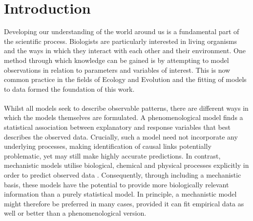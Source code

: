 \documentclass[11pt]{article}
\begin{document}

  

\doublespacing
\linenumbers 
\section{Introduction}
Developing our understanding of the world around us is a fundamental part of the scientific process. Biologists are particularly interested in living organisms and the ways in which they interact with each other and their environment. One method through which knowledge can be gained is by attempting to model observations in relation to parameters and variables of interest. This is now common practice in the fields of Ecology and Evolution and the fitting of models to data formed the foundation of this work. 
\\
\\
Whilst all models seek to describe observable patterns, there are different ways in which the models themselves are formulated. A phenomenological model finds a statistical association between explanatory and response variables that best describes the observed data. Crucially, such a model need not incorporate any underlying processes, making identification of causal links potentially problematic, yet may still make highly accurate predictions. In contrast, mechanistic models utilise biological, chemical and physical processes explicitly in order to predict observed data \cite{brown2004toward, schoolfield1981non}. Consequently, through including a mechanistic basis, these models have the potential to provide more biologically relevant information than a purely statistical model. In principle, a mechanistic model might therefore be preferred in many cases, provided it can fit empirical data as well or better than a phenomenological version.
\\
\\
\end{document}
